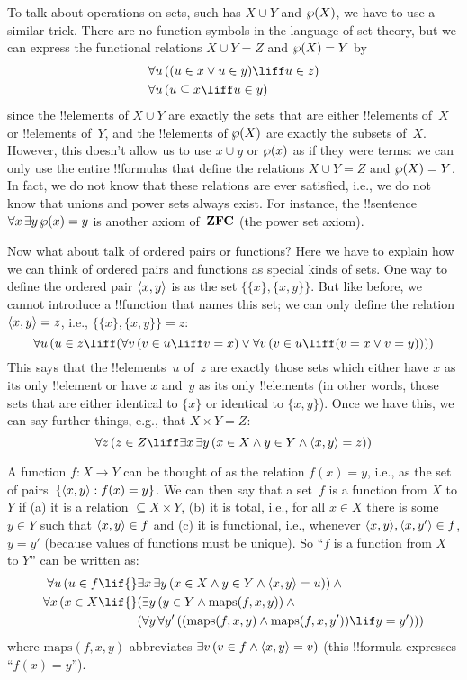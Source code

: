 \documentclass[../../../include/open-logic-section]{subfiles}
\begin{document}
To talk about operations on sets, such has $X \cup Y$ and $\wp(X)$, we
have to use a similar trick.  There are no function symbols in the
language of set theory, but we can express the functional relations $X
\cup Y = Z$ and $\wp(X) = Y$ by
\begin{align*}
& \lforall[u][((u \in x \lor u \in y) \liff u \in z)]\\
& \lforall[u][(u \subseteq x \liff u \in y )]
\end{align*}
since the !!{element}s of $X \cup Y$ are exactly the sets that are
either !!{element}s of~$X$ or !!{element}s of~$Y$, and the
!!{element}s of $\wp(X)$ are exactly the subsets of~$X$.  However,
this doesn't allow us to use $x \cup y$ or $\wp(x)$ as if they were
terms: we can only use the entire !!{formula}s that define the
relations $X \cup Y = Z$ and $\wp(X) = Y$. In fact, we do not know
that these relations are ever satisfied, i.e., we do not know that
unions and power sets always exist. For instance, the !!{sentence}
$\lforall[x][\lexists[y][\Pow{x} = y]]$ is another axiom
of~$\mathbf{ZFC}$ (the power set axiom).

Now what about talk of ordered pairs or functions?  Here we have to
explain how we can think of ordered pairs and functions as special
kinds of sets.  One way to define the ordered pair $\langle x, y \rangle$ is
as the set $\{\{x\}, \{x, y\}\}$.  But like before, we cannot
introduce a !!{function} that names this set; we can only define the
relation $\langle x, y \rangle = z$, i.e., $\{\{x\}, \{x, y\}\} = z$:
\[
\lforall[u][(u \in z \liff (\lforall[v][(v \in u \liff v = x)] \lor
  \lforall[v][(v \in u \liff (v = x \lor v = y))]))]
\]
This says that the !!{element}s~$u$ of~$z$ are exactly those sets which
either have $x$ as its only !!{element} or have $x$ and~$y$ as its
only !!{element}s (in other words, those sets that are either identical
to $\{x\}$ or identical to $\{x, y\}$).  Once we have this, we can say
further things, e.g., that $X \times Y = Z$:
\[
\lforall[z][(z \in Z \liff \lexists[x][\lexists[y][(x \in
        X \land y \in Y \land \tuple{x, y} = z)]])]
\]

A function $f \colon X \to Y$ can be thought of as the relation $f(x)
= y$, i.e., as the set of pairs~$\{ \langle x,y \rangle : f(x) = y \}$. We
can then say that a set~$f$ is a function from $X$ to $Y$ if (a) it is
a relation $\subseteq X \times Y$, (b) it is total, i.e., for all $x
\in X$ there is some $y \in Y$ such that $\langle x, y \rangle \in f$ and (c)
it is functional, i.e., whenever $\langle x, y \rangle, \langle x, y' \rangle \in f$,
$y = y'$ (because values of functions must be unique). So ``$f$ is a
function from $X$ to $Y$'' can be written as:
\begin{align*}
 \lforall[u][(u \in f \lif {}] & \lexists[x][\lexists[y][(x \in X \land y \in
      Y \land \tuple{x, y} = u)]]) \land {}\\
 \lforall[x][(x \in X \lif {}] &
      (\lexists[y][(y \in Y \land \mathrm{maps}(f, x, y))] \land {}\\
& (\lforall[y][\lforall[y'][((\mathrm{maps}(f, x, y) \land
    \mathrm{maps}(f, x, y')) \lif y = y')]]))
\end{align*}
where $\mathrm{maps}(f, x, y)$ abbreviates $\lexists[v][(v \in f \land
  \tuple{x, y} = v)]$ (this !!{formula} expresses ``$f(x) = y$'').
\end{document}
